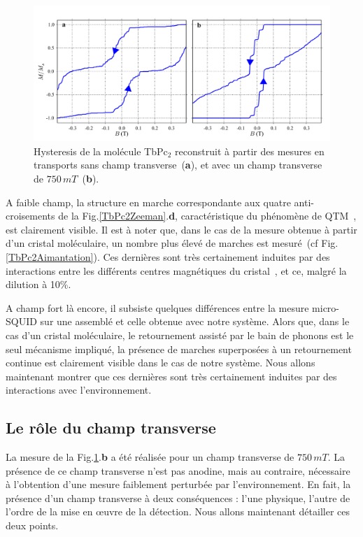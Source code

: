 \begin{figure}
\includegraphics[scale=0.45]{Resultats/CompCrisMolUnique/CompCrisMolUnique.pdf} 
\caption{Hysteresis de la molécule TbPc$_2$ reconstruit à partir des mesures en transports sans champ transverse~(\textbf{a}), et avec un champ transverse de $750\,mT$~(\textbf{b}).}
\label{CompAimant}
\end{figure}

A faible champ, la structure en marche correspondante aux quatre anti-croisements de la Fig.\ref{TbPc2Zeeman}.\textbf{d}, caractéristique du phénomène de QTM~\cite{Thomas1996,Friedman1996}, est clairement visible. Il est à noter que, dans le cas de la mesure obtenue à partir d'un cristal moléculaire, un nombre plus élevé de marches est mesuré~(cf Fig.\ref{TbPc2Aimantation}). Ces dernières sont très certainement induites par des interactions entre les différents centres magnétiques du cristal~\cite{Wernsdorfer2002}, et ce, malgré la dilution à 10\%.

A champ fort là encore, il subsiste quelques différences entre la mesure micro-SQUID sur une assemblé et celle obtenue avec notre système. Alors que, dans le cas d'un cristal moléculaire, le retournement assisté par le bain de phonons est le seul mécanisme impliqué, la présence  de marches superposées à un retournement continue est clairement visible dans le cas de notre système. Nous allons maintenant montrer que ces dernières sont très certainement induites par des interactions avec l'environnement.


\subsection{Le r\^ole du champ transverse}

La mesure de la Fig.\ref{CompAimant}.\textbf{b} a été réalisée pour un champ transverse de $750\,mT$. La présence de ce champ transverse n'est pas anodine, mais au contraire, nécessaire à l'obtention d'une mesure faiblement perturbée par l'environnement. En fait, la présence d'un champ transverse à deux conséquences : l'une physique, l'autre de l'ordre de la mise en œuvre de la détection. Nous allons maintenant détailler ces deux points.

